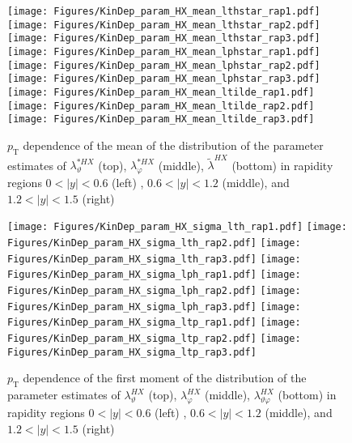\documentclass[12pt]{article}
\newcommand{\pT}{p_\mathrm{T}}
\newcommand{\absy}{\left |  y \right |}
\newcommand{\lamthHX}{\lambda^{\scriptscriptstyle HX}_\vartheta}
\newcommand{\lamphHX}{\lambda^{\scriptscriptstyle HX}_\varphi}
\newcommand{\lamthphHX}{\lambda^{\scriptscriptstyle HX}_{\vartheta \varphi}}
\newcommand{\lamtildeHX}{\tilde{\lambda}^{\scriptscriptstyle HX}}
\newcommand{\lamthstarHX}{\lambda^{* \scriptscriptstyle HX}_\vartheta}
\newcommand{\lamphstarHX}{\lambda^{* \scriptscriptstyle HX}_\varphi}
\begin{document}
\begin{figure}[htbp]
\centering
\texttt{[image: Figures/KinDep\_param\_HX\_mean\_lthstar\_rap1.pdf]}
\texttt{[image: Figures/KinDep\_param\_HX\_mean\_lthstar\_rap2.pdf]}
\texttt{[image: Figures/KinDep\_param\_HX\_mean\_lthstar\_rap3.pdf]}
\texttt{[image: Figures/KinDep\_param\_HX\_mean\_lphstar\_rap1.pdf]}
\texttt{[image: Figures/KinDep\_param\_HX\_mean\_lphstar\_rap2.pdf]}
\texttt{[image: Figures/KinDep\_param\_HX\_mean\_lphstar\_rap3.pdf]}
\texttt{[image: Figures/KinDep\_param\_HX\_mean\_ltilde\_rap1.pdf]}
\texttt{[image: Figures/KinDep\_param\_HX\_mean\_ltilde\_rap2.pdf]}
\texttt{[image: Figures/KinDep\_param\_HX\_mean\_ltilde\_rap3.pdf]}
\caption{$\pT$ dependence of the mean of the distribution of the parameter estimates of $\lamthstarHX$ (top), $\lamphstarHX$ (middle), $\lamtildeHX$ (bottom) in rapidity regions $0<\absy<0.6$ (left) , $0.6<\absy<1.2$ (middle), and $1.2<\absy<1.5$ (right)}
\end{figure}
\clearpage


\begin{figure}[htbp]
\centering
\texttt{[image: Figures/KinDep\_param\_HX\_sigma\_lth\_rap1.pdf]}
\texttt{[image: Figures/KinDep\_param\_HX\_sigma\_lth\_rap2.pdf]}
\texttt{[image: Figures/KinDep\_param\_HX\_sigma\_lth\_rap3.pdf]}
\texttt{[image: Figures/KinDep\_param\_HX\_sigma\_lph\_rap1.pdf]}
\texttt{[image: Figures/KinDep\_param\_HX\_sigma\_lph\_rap2.pdf]}
\texttt{[image: Figures/KinDep\_param\_HX\_sigma\_lph\_rap3.pdf]}
\texttt{[image: Figures/KinDep\_param\_HX\_sigma\_ltp\_rap1.pdf]}
\texttt{[image: Figures/KinDep\_param\_HX\_sigma\_ltp\_rap2.pdf]}
\texttt{[image: Figures/KinDep\_param\_HX\_sigma\_ltp\_rap3.pdf]}
\caption{$\pT$ dependence of the first moment of the distribution of the parameter estimates of $\lamthHX$ (top), $\lamphHX$ (middle), $\lamthphHX$ (bottom) in rapidity regions $0<\absy<0.6$ (left) , $0.6<\absy<1.2$ (middle), and $1.2<\absy<1.5$ (right)}
\end{figure}
\clearpage
\end{document}
